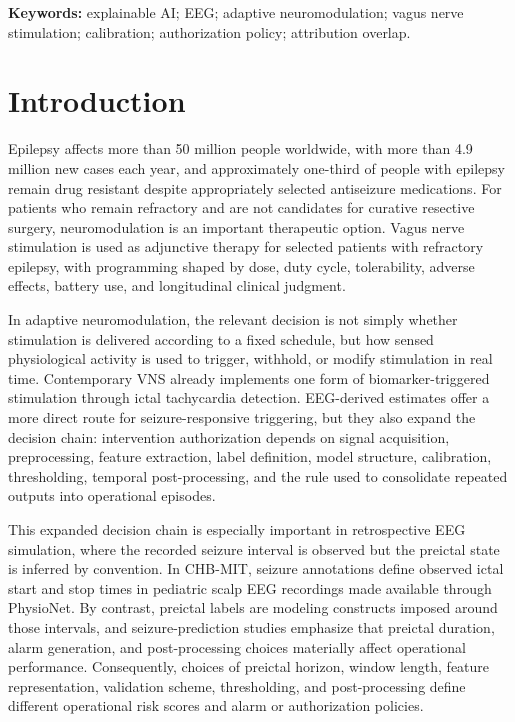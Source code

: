 \documentclass[11pt,a4paper]{article}
\begin{document}
\noindent\textbf{Keywords:} explainable AI; EEG; adaptive neuromodulation; vagus nerve stimulation; calibration; authorization policy; attribution overlap.

\section{Introduction}

Epilepsy affects more than 50 million people worldwide, with more than 4.9 million new cases each year, and approximately one-third of people with epilepsy remain drug resistant despite appropriately selected antiseizure medications\citep{guery2023drugresistant}. For patients who remain refractory and are not candidates for curative resective surgery, neuromodulation is an important therapeutic option. Vagus nerve stimulation is used as adjunctive therapy for selected patients with refractory epilepsy, with programming shaped by dose, duty cycle, tolerability, adverse effects, battery use, and longitudinal clinical judgment\citep{morris2013vns,fahoum2022vnsparams}.

In adaptive neuromodulation, the relevant decision is not simply whether stimulation is delivered according to a fixed schedule, but how sensed physiological activity is used to trigger, withhold, or modify stimulation in real time\citep{yang2024closedloop,rao2023rnsmechanisms}. Contemporary VNS already implements one form of biomarker-triggered stimulation through ictal tachycardia detection\citep{fisher2016autostim}. EEG-derived estimates offer a more direct route for seizure-responsive triggering, but they also expand the decision chain: intervention authorization depends on signal acquisition, preprocessing, feature extraction, label definition, model structure, calibration, thresholding, temporal post-processing, and the rule used to consolidate repeated outputs into operational episodes\citep{zhang2024eegreview,batista2024postprocessing}.

This expanded decision chain is especially important in retrospective EEG simulation, where the recorded seizure interval is observed but the preictal state is inferred by convention. In CHB-MIT, seizure annotations define observed ictal start and stop times in pediatric scalp EEG recordings made available through PhysioNet\citep{goldberger2000physionet,guttag2010chbmit}. By contrast, preictal labels are modeling constructs imposed around those intervals, and seizure-prediction studies emphasize that preictal duration, alarm generation, and post-processing choices materially affect operational performance\citep{batista2024postprocessing,andrade2024samplealarm}. Consequently, choices of preictal horizon, window length, feature representation, validation scheme, thresholding, and post-processing define different operational risk scores and alarm or authorization policies.
\end{document}
